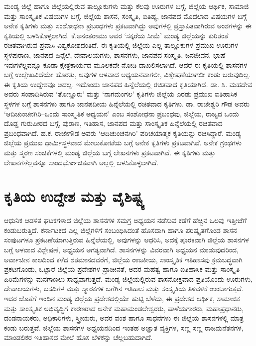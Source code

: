 ಮಂಡ್ಯ ಜಿಲ್ಲೆ ಹಾಗೂ ಜಿಲ್ಲೆಯಲ್ಲಿರುವ ತಾಲ್ಲೂಕುಗಳು ಮತ್ತು ಕೆಲವು ಊರುಗಳ ಬಗ್ಗೆ, ಜಿಲ್ಲೆಯ ಆರ್ಥಿಕ, ಸಾಮಾಜಿ ಮತ್ತು ಸಾಂಸ್ಕೃತಿಕ ವಿಷಯಗಳ ಬಗ್ಗೆ, ಜಿಲ್ಲೆಯ ಶಾಸನ, ಸಂಸ್ಕೃತಿ, ಐತಿಹ್ಯ, ಜಾನಪದ ಮೊದಲಾದ ವಿಷಯಗಳ ಬಗ್ಗೆ ಅನೇಕ ಕೃತಿಗಳು ಮತ್ತು ಸಂಶೋಧನಾ ಪ್ರಬಂಧಗಳು ಪ್ರಕಟವಾಗಿದ್ದು ಅವುಗಳಲ್ಲಿ ಪ್ರಸ್ತಾಪಿತವಾಗಿರುವ ಅಂಶಗಳನ್ನು ಈ ಕೃತಿಯಲ್ಲಿ ಬಳಸಿಕೊಳ್ಳಲಾಗಿದೆ. ಕೆ.ಅನಂತರಾಮು ಅವರ ‘ಸಕ್ಕರೆಯ ಸೀಮೆ’ ಮಂಡ್ಯ ಜಿಲ್ಲೆಯನ್ನು ಕುರಿತಂತೆ ರಚಿತವಾಗಿರುವ ಪ್ರವಾಸಿ ವಿಶ್ವಕೋಶದಂತಿದೆ. ಈ ಕೃತಿಯಲ್ಲಿ ಜಿಲ್ಲೆಯ ಎಲ್ಲ ತಾಲ್ಲೂಕುಗಳ ಪ್ರಮುಖ ಊರುಗಳ ಸ್ಥಳಪುರಾಣ, ಜಾನಪದ ಹಿನ್ನೆಲೆ, ದೇವಾಲಯಗಳು, ಶಾಸನಗಳು, ಜಾನಪದ ಸಂಸ್ಕೃತಿ, ಜನಜೀವನ, ಭಾಷೆ ಇವುಗಳೆಲ್ಲವನ್ನೂ ಕೂಡಾ ಕ್ಷೇತ್ರಕಾರ್ಯದ ಮೂಲಕವೇ ನೋಡಿ ದಾಖಲಿಸಲಾಗಿದೆ. ಆದರೆ ಈ ಕೃತಿಯಲ್ಲಿ ಶಾಸನಗಳ ಬಗ್ಗೆ ಉಲ್ಲೇಖವಿದೆಯೇ ಹೊರತು, ಅವುಗಳ ಆಳವಾದ ಅಧ್ಯಯನವಾಗಲೀ, ವಿಶ್ಲೇಷಣೆಯಾಗಲೀ ಕಂಡು ಬರುವುದಿಲ್ಲ. ಈ ಕೃತಿಯ ಉದ್ದೇಶವೂ ಅದಲ್ಲ. ಇದೊಂದು ಜಾನಪದ ಹಿನ್ನೆಲೆಯಲ್ಲಿ ರಚಿತವಾದ ಕೃತಿಯಾಗಿದೆ. ಡಾ. ಸಿ. ಮಹದೇವ ಅವರು ಸಂಪಾದಿಸಿರುವ ‘ತೊಣ್ಣೂರು’ ಮತ್ತು ‘ನಾಗಮಂಗಲ’ ಕೃತಿಗಳು ಜಿಲ್ಲೆಯ ಎರಡು ಪ್ರಮುಖ ಐತಿಹಾಸಿಕ ಸ್ಥಳಗಳ ಬಗ್ಗೆ ಶಾಸನಗಳು ಹಾಗೂ ಜಾನಪದೀಯ ಹಿನ್ನೆಲೆಯಲ್ಲಿ ರಚಿತವಾದ ಕೃತಿಗಳು. ಡಾ. ರಾಜೇಶ್ವರಿ ಗೌಡ ಅವರು ‘ಆದಿಚುಂಚನಗಿರಿ–ಒಂದು ಸಾಂಸ್ಕೃತಿಕ ಅಧ್ಯಯನ’ ಎಂಬ ಸಂಶೋಧನಾ ಪ್ರಬಂಧವು, ಜಿಲ್ಲೆಯ, ರಾಜ್ಯದ ಒಂದು ದೊಡ್ಡ ಗುರುಪೀಠದ ಬಗ್ಗೆ, ಪುರಾಣ, ಇತಿಹಾಸ, ಜಾನಪದ ಮತ್ತು ಸಾಂಸ್ಕೃತಿಕ ಹಿನ್ನೆಲೆಯಲ್ಲಿ ರಚಿತವಾದ ಪ್ರಬಂಧವಾಗಿದೆ. ಹ.ಕ. ರಾಜೇಗೌಡ ಅವರು ‘ಆದಿಚುಂಚನಗಿರಿ’ ಪರಿಚಯಾತ್ಮಕ ಕೃತಿಯನ್ನು ರಚಿಸಿದ್ದಾರೆ. ಮಂಡ್ಯ ಜಿಲ್ಲೆಯ ಪ್ರಮುಖ ಧಾರ್ಮಿಸ್ಥಳವಾದ ಮೇಲುಕೋಟೆಯ ಬಗ್ಗೆ ಅನೇಕ ಕೃತಿಗಳು ಪ್ರಕಟವಾಗಿವೆ. ಅನೇಕ ಗ್ರಂಥಗಳು ಮತ್ತು ಸ್ಮರಣ ಸಂಚಿಕೆಗಳಲ್ಲಿ ಮಂಡ್ಯ ಜಿಲ್ಲೆಯ ಬಗ್ಗೆ ಲೇಖನಗಳು ಪ್ರಕಟವಾಗಿವೆ. ಈ ಕೃತಿಗಳು ಮತ್ತು ಲೇಖನಗಳೆಲ್ಲವನ್ನೂ ಸಾಂದರ್ಭೋಚಿತವಾಗಿ ಅಲ್ಲಲ್ಲಿ ಬಳಸಿಕೊಳ್ಳಲಾಗಿದೆ.


\section{ಕೃತಿಯ ಉದ್ದೇಶ ಮತ್ತು ವೈಶಿಷ್ಟ್ಯ}

ಆಧುನಿಕ ಆಡಳಿತ ಘಟಕಗಳಾದ ಜಿಲ್ಲೆಯ ಶಾಸನಗಳ ಸಮಗ್ರ ಅಧ್ಯಯನ ನಡೆಸುವ ಕಡೆಗೆ ಹೆಚ್ಚಿನ ಒಲವು ಇತ್ತೀಚೆಗೆ ಕಂಡುಬರುತ್ತಿದೆ. ಕರ್ನಾಟಕದ ಎಲ್ಲ ಜಿಲ್ಲೆಗಳಿಗೆ ಸಂಬಂಧಿಸಿದಂತೆ ಹೊಸದಾಗಿ ಹಾಗೂ ಪರಿಷ್ಕೃತಗೊಂಡ ಶಾಸನ ಸಂಪುಟಗಳೂ ಪ್ರಕಟಣೆಯಾಗುತ್ತಿರುವ ಹಿನ್ನೆಲೆಯಲ್ಲಿ, ಅವುಗಳನ್ನು ಆಧರಿಸಿ, ಅದಕ್ಕೆ ಪೂರಕವಾಗಿ ಜಿಲ್ಲೆಯ ಶಾಸನಗಳ ಬಗ್ಗೆ ಆಳವಾದ ವಿಶ್ಲೇಷಣೆ, ಅಧ್ಯಯನ ಅಗತ್ಯವಾಗಿದೆ. ಶಾಸನಗಳನ್ನು ವಿವರವಾಗಿ ಅಧ್ಯಯನ ಮಾಡುವುದರಿಂದ, ಅರ್ವಾಚೀನ ಕಾಲದಿಂದ ಕಳೆದ ಶತಮಾನದವರೆಗೆ, ಜಿಲ್ಲೆಯ ರಾಜಕೀಯ, ಸಾಂಸ್ಕೃತಿಕ ಇತಿಹಾಸವು ಕ್ರಮಬದ್ಧವಾಗಿ ಪ್ರಕಟಗೊಂಡು, ಒಟ್ಟಾರೆ ಜಿಲ್ಲೆಯ ಪ್ರದೇಶಗಳ ಪ್ರಾಚೀನತೆ, ಅದರ ಮಹತ್ವ ಹಾಗೂ ಐತಿಹಾಸಿಕ ಮತ್ತು ಸಾಂಸ್ಕೃತಿ ಹಿರಿಮೆಗಳನ್ನು ಮನಗಾಣಲು ಸಾಧ್ಯವಾಗುತ್ತದೆ. ಮಂಡ್ಯ ಜಿಲ್ಲೆಯಲ್ಲಿರುವ ಶಾಸನೋಕ್ತವಾದ ಪ್ರತಿಯೊಂದು ಊರುಗಳು, ದೇವಾಲಯಗಳು, ಬಸದಿಗಳ ಮತ್ತು ಸ್ಮಾರಕಗಳ ಬಗೆಗಿನ ಇತಿಹಾಸ ಮತ್ತು ಸಂಸ್ಕೃತಿಯ ತಿಳಿವಳಿಕೆ ಉಂಟಾಗುತ್ತದೆ. ಇದರ ಜೊತೆಗೆ ಇಂದಿನ ಮಂಡ್ಯ ಜಿಲ್ಲೆಯ ಪ್ರದೇಶದಲ್ಲಿಯೇ ಹುಟ್ಟಿ ಬೆಳೆದು, ಈ ಪ್ರದೇಶದ ಆರ್ಥಿಕ, ಸಾಮಾಜಿಕ ಮತ್ತು ಸಾಂಸ್ಕೃತಿಕ ಅಭಿವೃದ್ಧಿಗೆ ಕಾರಣರಾದ ಅನೇಕ ಮಹಾಮಂಡಲೇಶ್ವರರು, ಪಾಳೆಯಗಾರರು, ಮಹಾಪ್ರಧಾನರು, ದಂಡನಾಯಕರು, ಅಧಿಕಾರಿಗಳು, ಸ್ತ್ರೀಯರು, ಅವರ ವಂಶ ಹಾಗೂ ಸಾಧನೆಗಳು ಈ ಜಿಲ್ಲೆಯ ಶಾಸನಗಳಲ್ಲಿ ಮಾತ್ರ ಕಂಡು ಬರುತ್ತವೆ. ಜಿಲ್ಲೆಯ ಶಾಸನಗಳ ಅಧ್ಯಯನದಿಂದ ಇಂತಹ ಅಜ್ಞಾತ ವ್ಯಕ್ತಿಗಳ, ಸಣ್ಣ ಸಣ್ಣ ರಾಜಮನೆತನಗಳ, ಮಾಂಡಲಿಕರ ಇತಿಹಾಸದ ಮೇಲೆ ಹೊಸ ಬೆಳಕನ್ನು ಚೆಲ್ಲಬಹುದಾಗಿದೆ.

